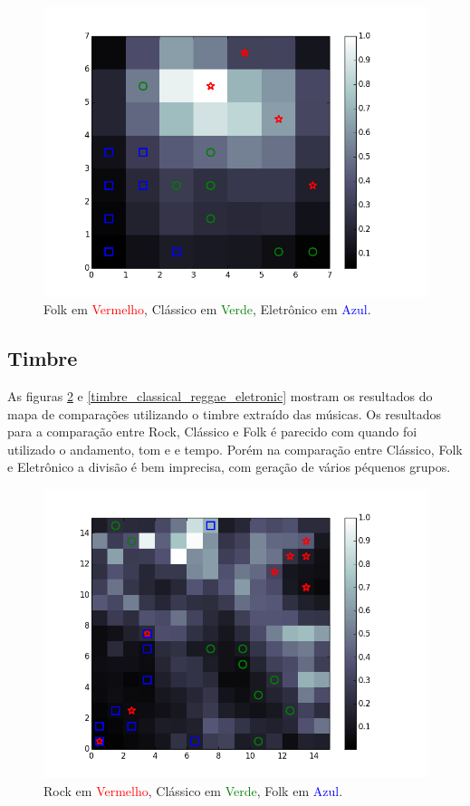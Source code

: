\documentclass[journal]{IEEEtran}
\begin{document}
\begin{figure}[H]
\centering
\includegraphics[scale=0.5]{images/key_tempo_classical_eletronic_folk.png}
\caption{Folk em \textcolor{red}{Vermelho}, Clássico em \textcolor{green}{Verde}, Eletrônico em \textcolor{blue}{Azul}.}\label{key_tempo_classical_eletronic_folk}
\end{figure}

\subsection{Timbre}
As figuras \ref{timbre_rock_folk_classical} e \ref{timbre_classical_reggae_eletronic} mostram os resultados do mapa de comparações utilizando o timbre extraído das músicas. Os resultados para a comparação entre Rock, Clássico e Folk é parecido com quando foi utilizado o andamento, tom e e tempo. Porém na comparação entre Clássico, Folk e Eletrônico a divisão é bem imprecisa, com geração de vários péquenos grupos.

\begin{figure}[H]
\centering
\includegraphics[scale=0.5]{images/timbre_rock_folk_classical.png}
\caption{Rock em \textcolor{red}{Vermelho}, Clássico em \textcolor{green}{Verde}, Folk em \textcolor{blue}{Azul}.}\label{timbre_rock_folk_classical}
\end{figure}
\end{document}
